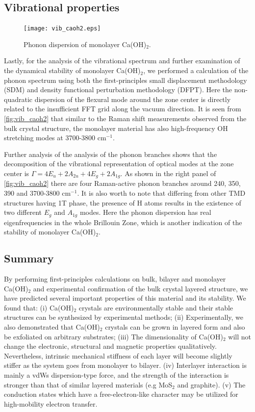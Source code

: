 \subsection{Vibrational properties}\label{stability}
\begin{figure}[htbp]
\centering
\texttt{[image: vib\_caoh2.eps]}
\caption{\label{fig:vib_caoh2} Phonon dispersion of monolayer Ca(OH)$_2$.}
\end{figure}

Lastly, for the analysis of the vibrational spectrum and further examination of 
the dynamical stability of monolayer Ca(OH)$_2$, we performed a 
calculation of the phonon spectrum using both the first-principles small 
displacement methodology (SDM)\cite{alfe} and density functional perturbation 
methodology (DFPT)\cite{baroni}. Here the non-quadratic dispersion of the 
flexural mode around the zone center is directly related to the insufficient 
FFT grid along the vacuum direction. It is seen from \autoref{fig:vib_caoh2} that 
similar to the Raman shift measurements observed from the bulk crystal 
structure, the monolayer material has also high-frequency OH stretching 
modes at 3700-3800 cm$^{-1}$. 

Further analysis of the analysis of the phonon 
branches shows that the decomposition of the vibrational representation of optical 
modes at the zone center is $\Gamma = 4E_{u} + 2A_{2u} + 4E_{g} + 2A_{1g}$. As 
shown in the right panel of \autoref{fig:vib_caoh2} there are four Raman-active phonon 
branches around 240, 350, 390 and 3700-3800 cm$^{-1}$. It is also worth to note 
that differing from other TMD structures having 1T phase, the presence of H atoms 
results in the existence of two different $E_{g}$ and $A_{1g}$ modes. Here the 
phonon dispersion has real eigenfrequencies in the whole Brillouin Zone, 
which is another indication of the stability of monolayer Ca(OH)$_2$.

\subsection{Summary}\label{disc}

By performing first-principles calculations on bulk, bilayer and 
monolayer Ca(OH)$_2$ and experimental confirmation of the bulk crystal 
layered structure, we have predicted several important properties of this 
material and its stability. We found that: (i) Ca(OH)$_2$ crystals are 
environmentally stable and their stable structures can be synthesized by 
experimental methods; (ii) Experimentally, we also demonstrated that Ca(OH)$_2$ 
crystals can be grown in layered form and also be exfoliated on arbitrary 
substrates; (iii) The dimensionality of Ca(OH)$_2$ will not change the 
electronic, structural and magnetic properties qualitatively. Nevertheless, intrinsic mechanical stiffness of each layer will become slightly stiffer as 
the system goes from monolayer to bilayer. (iv) Interlayer interaction is mainly a
vdWs dispersion-type force, and
the strength of the interaction is stronger than that of similar layered
materials (e.g MoS$_2$ and graphite). (v) The 
conduction states which have a free-electron-like character may be utilized for 
high-mobility electron transfer. 

